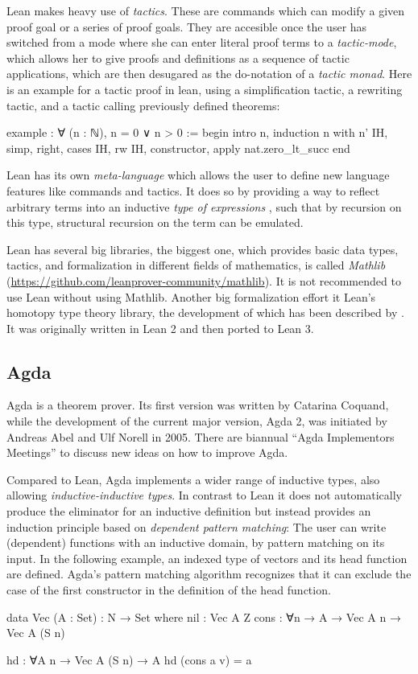 Lean makes heavy use of \emph{tactics}.
These are commands which can modify a given proof goal or a series of proof
goals.
They are accesible once the user has switched from a mode where she can
enter literal proof terms to a \emph{tactic-mode},
which allows her to give proofs and definitions as a sequence of tactic applications,
which are then desugared as the do-notation of a \emph{tactic monad}.
Here is an example for a tactic proof in lean, using a simplification tactic,
a rewriting tactic, and a tactic calling previously defined theorems:
\begin{leancodebr}
example : ∀ (n : ℕ), n = 0 ∨ n > 0 :=
begin
  intro n,
  induction n with n' IH,
  simp,
  right,
  cases IH,
  rw IH, constructor,
  apply nat.zero_lt_succ
end
\end{leancodebr}

Lean has its own \emph{meta-language} which allows the user to define new
language features like commands and tactics.
It does so by providing a way to reflect arbitrary terms into an inductive \emph{type of
expressions} ,
such that by recursion on this type, structural recursion on the term can 
be emulated.

Lean has several big libraries, the biggest one, which provides basic data types,
tactics, and formalization in different fields of mathematics, is called
\emph{Mathlib} (\url{https://github.com/leanprover-community/mathlib}).
It is not recommended to use Lean without using Mathlib.
Another big formalization effort it Lean's homotopy type theory library,
the development of which has been described by \citet{leanhott}.
It was originally written in Lean 2 and then ported to Lean 3.

\subsection{Agda}

Agda is a theorem prover. Its first version was written by Catarina Coquand, while
the development of the current major version, Agda 2, was initiated by
Andreas Abel and Ulf Norell in 2005.
There are biannual ``Agda Implementors Meetings'' to discuss new ideas on how to
improve Agda.

Compared to Lean, Agda implements a wider range of inductive types,
also allowing \emph{inductive-inductive types}.
In contrast to Lean it does not automatically produce the eliminator for an
inductive definition but instead provides an induction principle based
on \emph{dependent pattern matching}:
The user can write (dependent) functions with an inductive domain, by pattern
matching on its input.
In the following example, an indexed type of vectors and its head function are
defined.
Agda's pattern matching algorithm recognizes that it can exclude the case of the first
constructor in the definition of the head function.
\begin{agdacode}
data Vec (A : Set) : N → Set where
  nil : Vec A Z
  cons : ∀{n} → A → Vec A n → Vec A (S n)

hd : ∀{A n} → Vec A (S n) → A
hd (cons a v) = a
\end{agdacode}

